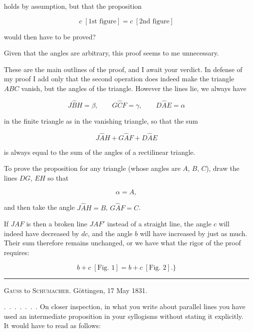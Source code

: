 %
\noindent holds by assumption, but that the proposition

\[ c\;[\text{1st figure}] = c\;[\text{2nd figure}] \]

\noindent would then have to be proved?

Given that the angles are arbitrary, this proof seems to me unnecessary.

These are the main outlines of the proof, and I await your verdict. In defense of my proof I add only that the second operation does indeed make the triangle $ABC$ vanish, but  the angles of the triangle. However the lines lie, we always have

\[ J\hat{B}H = \beta, \qquad G\hat{C}F = \gamma, \qquad D\hat{A}E = \alpha \]

\noindent in the finite triangle as in the vanishing triangle, so that the sum

\[ J\hat{A}H + G\hat{A}F + D\hat{A}E \]

\noindent is always equal to the sum of the angles of a rectilinear triangle.

To prove the proposition for any triangle (whose angles are $A$, $B$, $C$), draw the lines $DG$, $EH$ so that

\[ \alpha = A, \]

\noindent and then take the angle $J\hat{A}H = B$, $G\hat{A}F = C$.

If $JAF$ is then a broken line $JAF'$ instead of a straight line, the angle $c$ will indeed have decreased by $dc$, and the angle $b$ will have increased by just as much. Their sum therefore remains unchanged, or we have what the rigor of the proof requires:

\[ b + c\;[\text{Fig. 1}] = b + c\;[\text{Fig. 2}].\} \]

\bigskip
\hrule
\bigskip

\begin{center}
\textsc{Gauss} to \textsc{Schumacher}. Göttingen, 17 May 1831.
\end{center}

\mbox{.\ .\ .\ .\ .\ .\ .} On closer inspection, in what you write about parallel lines you have used an intermediate proposition in your syllogisms without stating it explicitly. It would have to read as follows:
